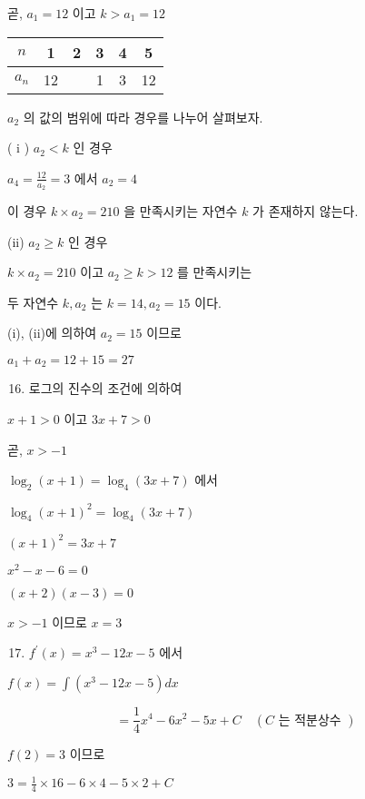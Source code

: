 \documentclass[10pt]{article}
\begin{document}
곧, \(a_{1}=12\) 이고 \(k>a_{1}=12\)

\begin{center}
\begin{tabular}{|c|c|c|c|c|c|}
\hline
\(n\) & 1 & 2 & 3 & 4 & 5 \\
\hline
\(a_{n}\) & 12 &  & 1 & 3 & 12 \\
\hline
\end{tabular}
\end{center}

\(a_{2}\) 의 값의 범위에 따라 경우를 나누어 살펴보자.

( i ) \(a_{2}<k\) 인 경우

\(a_{4}=\frac{12}{a_{2}}=3\) 에서 \(a_{2}=4\)

이 경우 \(k \times a_{2}=210\) 을 만족시키는 자연수 \(k\) 가 존재하지 않는다.

(ii) \(a_{2} \geq k\) 인 경우

\(k \times a_{2}=210\) 이고 \(a_{2} \geq k>12\) 를 만족시키는

두 자연수 \(k, a_{2}\) 는 \(k=14, a_{2}=15\) 이다.

(i), (ii)에 의하여 \(a_{2}=15\) 이므로

\(a_{1}+a_{2}=12+15=27\)

\begin{enumerate}
  \setcounter{enumi}{15}
  \item 로그의 진수의 조건에 의하여
\end{enumerate}

\(x+1>0\) 이고 \(3 x+7>0\)

곧, \(x>-1\)

\(\log _{2}(x+1)=\log _{4}(3 x+7)\) 에서

\(\log _{4}(x+1)^{2}=\log _{4}(3 x+7)\)

\((x+1)^{2}=3 x+7\)

\(x^{2}-x-6=0\)

\((x+2)(x-3)=0\)

\(x>-1\) 이므로 \(x=3\)

\begin{enumerate}
  \setcounter{enumi}{16}
  \item \(f^{\prime}(x)=x^{3}-12 x-5\) 에서
\end{enumerate}

\(f(x)=\int\left(x^{3}-12 x-5\right) d x\)

\[
=\frac{1}{4} x^{4}-6 x^{2}-5 x+C \quad(C \text { 는 적분상수 })
\]

\(f(2)=3\) 이므로

\(3=\frac{1}{4} \times 16-6 \times 4-5 \times 2+C\)
\end{document}
